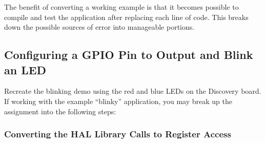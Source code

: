 \documentclass[openany,11pt,fleqn]{book} %
\begin{document}
The benefit of converting a working example is that it becomes possible to compile and test the application after replacing each line of code. This breaks down the possible sources of error into manageable portions. 

\subsection{Configuring a GPIO Pin to Output and Blink an LED}

Recreate the blinking demo using the red and blue LEDs on the Discovery board. If working with the example ``blinky'' application, you may break up the assignment into the following steps:

\subsubsection{Converting the HAL Library Calls to Register Access}
\end{document}
